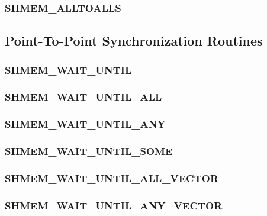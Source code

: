 \documentclass[10pt]{book}
\begin{document}
\subsubsection{\textbf{SHMEM\_ALLTOALLS}}\label{subsec:shmem_alltoalls}





\subsection{Point-To-Point Synchronization Routines}\label{subsec:p2p_intro}


\subsubsection{\textbf{SHMEM\_WAIT\_UNTIL}}\label{subsec:shmem_wait_until}


\subsubsection{\textbf{SHMEM\_WAIT\_UNTIL\_ALL}}\label{subsec:shmem_wait_until_all}


\subsubsection{\textbf{SHMEM\_WAIT\_UNTIL\_ANY}}\label{subsec:shmem_wait_until_any}


\subsubsection{\textbf{SHMEM\_WAIT\_UNTIL\_SOME}}\label{subsec:shmem_wait_until_some}


\subsubsection{\textbf{SHMEM\_WAIT\_UNTIL\_ALL\_VECTOR}}\label{subsec:shmem_wait_until_all_vector}


\subsubsection{\textbf{SHMEM\_WAIT\_UNTIL\_ANY\_VECTOR}}\label{subsec:shmem_wait_until_any_vector}

\end{document}
